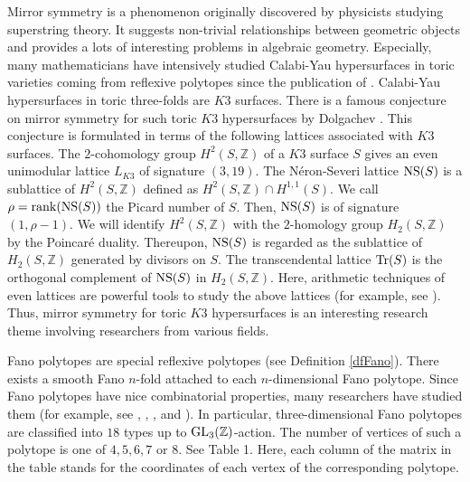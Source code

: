 \documentclass[10pt]{article}
\begin{document}
Mirror symmetry is a phenomenon originally discovered by physicists  studying superstring theory.
It suggests  non-trivial relationships between geometric objects
and provides a lots of interesting problems in algebraic geometry.
Especially,
many mathematicians have intensively studied Calabi-Yau hypersurfaces in toric varieties coming from reflexive polytopes since the publication of \cite{B}.
Calabi-Yau hypersurfaces in toric three-folds are $K3$ surfaces.
There is a famous conjecture  on mirror symmetry for such toric $K3$ hypersurfaces by Dolgachev \cite{D}.
This conjecture is formulated in terms of the following lattices associated with $K3$ surfaces.
The $2$-cohomology group $H^2(S,\mathbb{Z})$ of a $K3$ surface $S$ gives an even unimodular lattice $L_{K3}$ of signature $(3,19).$ 
The N\'eron-Severi lattice ${\rm NS}(S)$ is a sublattice of $H^2(S,\mathbb{Z})$ defined as $H^2(S,\mathbb{Z}) \cap H^{1,1}(S)$.
We call $\rho={\rm rank}({\rm NS} (S))$ the Picard number of $S$.
Then, ${\rm NS}(S)$ is of signature $(1,\rho-1)$.
We will identify $H^2(S,\mathbb{Z})$ with the $2$-homology group $H_2(S,\mathbb{Z})$ by the Poincar\'e duality.
Thereupon, ${\rm NS}(S)$ is regarded as the sublattice of $H_2(S,\mathbb{Z})$ generated by divisors on $S$. 
The transcendental lattice ${\rm Tr}(S)$ is the orthogonal complement of ${\rm NS}(S)$ in $H_2(S,\mathbb{Z})$.
Here, arithmetic techniques of  even lattices are powerful tools to study the above lattices  (for example, see \cite{Ni}).
Thus, mirror symmetry for toric $K3$ hypersurfaces is an interesting research theme involving researchers from various fields.


Fano polytopes are special reflexive polytopes (see Definition \ref{dfFano}).
There exists a smooth Fano $n$-fold attached to each $n$-dimensional Fano polytope.
Since Fano polytopes have nice combinatorial properties,
many researchers have  studied them (for example, see  \cite{BToric}, \cite{BToric4},  \cite{WW}, \cite{Sa} and \cite{Ob}).
In particular, three-dimensional Fano polytopes are classified into $18$ types up to ${\rm GL}_3(\mathbb{Z})$-action.
The number of vertices of such a polytope is one of $4,5,6,7$ or $8$.
See Table 1.
Here, each column of the matrix in the table  stands for  the coordinates of each vertex of the corresponding  polytope.
\end{document}

